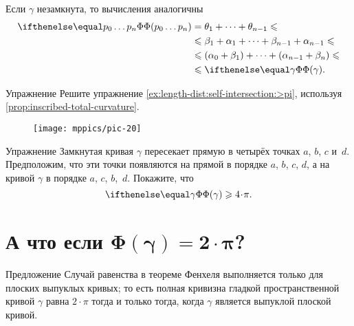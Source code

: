 Если $\gamma$ незамкнута, то вычисления аналогичны
\begin{align*}
\tc{p_0\dots p_n}&=\theta_1+\dots+\theta_{n-1}\le 
\\
&\le\beta_1+\alpha_1+\dots+\beta_{n-1}+\alpha_{n-1} \le
\\
&\le (\alpha_0+\beta_1)+\dots+(\alpha_{n-1}+\beta_n) \le 
\\
&\le \tc\gamma.
\end{align*}
\qedsf

\begin{thm}{Упражнение}\label{ex:sef-intersection}\label{ex:sef-intersection:>pi}  
Решите упражнение \ref{ex:length-dist:self-intersection:>pi}, используя \ref{prop:inscribed-total-curvature}.
\end{thm}

\begin{wrapfigure}{r}{30 mm}
\vskip-0mm
\centering
\texttt{[image: mppics/pic-20]}
\vskip0mm
\end{wrapfigure}

\begin{thm}{Упражнение}\label{ex:quadrisecant}
Замкнутая кривая $\gamma$ пересекает прямую в четырёх точках $a$, $b$, $c$ и~$d$.
Предположим, что эти точки появляются на прямой в порядке $a$, $b$, $c$, $d$, а на кривой $\gamma$ в порядке $a$, $c$, $b$,~$d$.
Покажите, что 
\[\tc\gamma\ge 4\cdot\pi.\]

\end{thm}


\section[\texorpdfstring{А что если $\Phi(\gamma)=2\cdot \pi$?}{А что если Φ(γ)=2·π?}]{А что если $\bm{\Phi(\gamma)=2\cdot \pi}$?}

\begin{thm}{Предложение}\label{prop:fenchel=}
Случай равенства в теореме Фенхеля выполняется только для плоских выпуклых кривых;
то есть полная кривизна гладкой пространственной кривой $\gamma$ равна $2\cdot\pi$ тогда и только тогда, когда $\gamma$ является выпуклой плоской кривой.
\end{thm}

